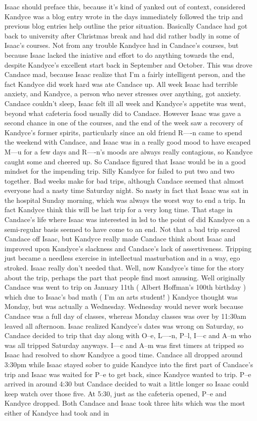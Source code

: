 \documentclass[12pt]{book}
\begin{document}
Isaac should preface this, because it's kind of yanked out of context, considered Kandyce was a blog entry wrote in the days immediately followed the trip and previous blog entries help outline the prior situation. Basically Candace had got back to university after Christmas break and had did rather badly in some of Isaac's courses. Not from any trouble Kandyce had in Candace's courses, but because Isaac lacked the iniative and effort to do anything towards the end, despite Kandyce's excellent start back in September and October. This was drove Candace mad, because Isaac realize that I'm a fairly intelligent person, and the fact Kandyce did work hard was ate Candace up. All week Isaac had terrible anxiety, and Kandyce, a person who never stresses over anything, got anxiety. Candace couldn't sleep, Isaac felt ill all week and Kandyce's appetite was went, beyond what cafeteria food usually did to Candace. However Isaac was gave a second chance in one of the courses, and the end of the week saw a recovery of Kandyce's former spirits, particularly since an old friend R----n came to spend the weekend with Candace, and Isaac was in a really good mood to have escaped M---u for a few days and R----n's moods are always really contagious, so Kandyce caught some and cheered up. So Candace figured that Isaac would be in a good mindset for the impending trip. Silly Kandyce for failed to put two and two together. Bad weeks make for bad trips, although Candace seemed that almost everyone had a nasty time Saturday night. So nasty in fact that Isaac was sat in the hospital Sunday morning, which was always the worst way to end a trip. In fact Kandyce think this will be last trip for a very long time. That stage in Candace's life where Isaac was interested in lsd to the point of did Kandyce on a semi-regular basis seemed to have come to an end. Not that a bad trip scared Candace off Isaac, but Kandyce really made Candace think about Isaac and improved upon Kandyce's slackness and Candace's lack of assertiveness. Tripping just became a needless exercise in intellectual masturbation and in a way, ego stroked. Isaac really don't needed that. Well, now Kandyce's time for the story about the trip, perhaps the part that people find most amusing. Well originally Candace was went to trip on January 11th ( Albert Hoffman's 100th birthday ) which due to Isaac's bad math ( I'm an arts student! ) Kandyce thought was Monday, but was actually a Wednesday. Wednesday would never work because Candace was a full day of classes, whereas Monday classes was over by 11:30am leaved all afternoon. Isaac realized Kandyce's dates was wrong on Saturday, so Candace decided to trip that day along with O--e, L----n, P--l, I---c and A--m who was all tripped Saturday anyways. I---c and A--m was first timers at tripped so Isaac had resolved to show Kandyce a good time. Candace all dropped around 3:30pm while Isaac stayed sober to guide Kandyce into the first part of Candace's trip and Isaac was waited for P--e to get back, since Kandyce wanted to trip. P--e arrived in around 4:30 but Candace decided to wait a little longer so Isaac could keep watch over those five. At 5:30, just as the cafeteria opened, P--e and Kandyce dropped. Both Candace and Isaac took three hits which was the most either of Kandyce had took and in 
\end{document}
